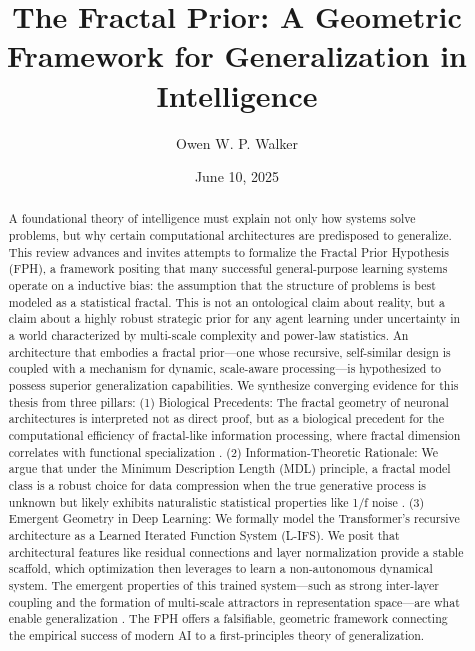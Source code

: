\documentclass[11pt,a4paper]{article}
\title{\textbf{The Fractal Prior: A Geometric Framework for Generalization in Intelligence}}
\author[1]{Owen W. P. Walker}
\affil[1]{Independent Researcher\ \href{mailto:walk9312@mylaurier.ca}{walk9312@mylaurier.ca}}
\date{June 10, 2025}
\begin{document}
\maketitle

\begin{abstract}
\noindent A foundational theory of intelligence must explain not only how systems solve problems, but why certain computational architectures are predisposed to generalize. This review advances and invites attempts to formalize the Fractal Prior Hypothesis (FPH), a framework positing that many successful general-purpose learning systems operate on a  inductive bias: the assumption that the structure of problems is best modeled as a statistical fractal. This is not an ontological claim about reality, but a claim about a highly robust strategic prior for any agent learning under uncertainty in a world characterized by multi-scale complexity and power-law statistics. An architecture that embodies a fractal prior—one whose recursive, self-similar design is coupled with a mechanism for dynamic, scale-aware processing—is hypothesized to possess superior generalization capabilities. We synthesize converging evidence for this thesis from three pillars: (1) Biological Precedents: The fractal geometry of neuronal architectures is interpreted not as direct proof, but as a biological precedent for the computational efficiency of fractal-like information processing, where fractal dimension correlates with functional specialization \cite{grosu2023fractal, smith2021neurons}. (2) Information-Theoretic Rationale: We argue that under the Minimum Description Length (MDL) principle, a fractal model class is a robust choice for data compression when the true generative process is unknown but likely exhibits naturalistic statistical properties like 1/f noise \cite{li2009kolmogorov, gershenson2025self}. (3) Emergent Geometry in Deep Learning: We formally model the Transformer's recursive architecture as a Learned Iterated Function System (L-IFS). We posit that architectural features like residual connections and layer normalization provide a stable scaffold, which optimization then leverages to learn a non-autonomous dynamical system. The emergent properties of this trained system—such as strong inter-layer coupling and the formation of multi-scale attractors in representation space—are what enable  generalization \cite{noci2024transformer}. The FPH offers a falsifiable, geometric framework connecting the empirical success of modern AI to a first-principles theory of generalization.
\end{abstract}
\end{document}
